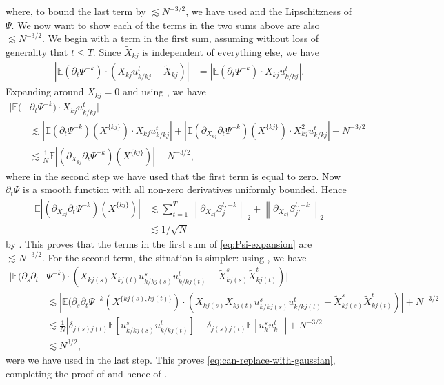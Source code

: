 \documentclass{article}
\newcommand{\1}{\mathbbm{1}}
\newcommand{\norm}[1]{\left\lVert#1\right\rVert}
\theoremstyle{plain}
\theoremstyle{definition}
\theoremstyle{remark}
\newcommand{\E}{\mathbb{E}}
\begin{document}
    where, to bound the last term by $\lesssim N^{-3/2}$, we have used  and the Lipschitzness of $\Psi.$ We now want to show each of the terms in the two sums above are also $\lesssim N^{-3/2}.$ We begin with a term in the first sum, assuming without loss of generality that $t\leq T.$ Since $\tilde{X}_{kj}$ is independent of everything else, we have 
    \begin{align*}
        |\E (\partial_t \Psi^{-k})\cdot (X_{kj}u_{k/kj}^{t} - \tilde{X}_{kj})| &=|\E (\partial_t \Psi^{-k})\cdot X_{kj} u_{k/kj}^{t}|.
    \end{align*}
    Expanding around $X_{kj}=0$ and using , we have 
    \begin{align*}
        |\E (&\partial_t \Psi^{-k})\cdot X_{kj} u_{k/kj}^{t}| \\
        &\lesssim  |\E (\partial_t \Psi^{-k})(X^{\{kj\}})\cdot X_{kj} u_{k/kj}^{t}| + |\E ( \partial_{X_{kj}}\partial_t\Psi^{-k})(X^{\{kj\}})\cdot X^2_{kj} u_{k/kj}^{t}| + N^{-3/2}\\
        &\lesssim \frac{1}{N}\E| ( \partial_{X_{kj}}\partial_t\Psi^{-k})(X^{\{kj\}})| + N^{-3/2},
    \end{align*}
    where in the second step we have used that the first term is equal to zero. Now $\partial_t \Psi$ is a smooth function with all non-zero derivatives uniformly bounded. Hence
    \begin{align*}
        \E| ( \partial_{X_{kj}}\partial_t\Psi^{-k})(X^{\{kj\}})| &\lesssim \sum_{t=1}^T \norm{\partial_{X_{kj}}S^{t,-k}_j}_2 + \norm{\partial_{X_{kj}}S^{t,-k}_{j'}}_2 \\
        &\lesssim 1/\sqrt{N}
    \end{align*}
    by . This proves that the terms in the first sum of \eqref{eq:Psi-expansion} are $\lesssim N^{-3/2}.$ For the second term, the situation is simpler: using , we have
    \begin{align*}
        | \E(\partial_{s}\partial_t &\Psi^{-k})\cdot (X_{kj(s)}X_{kj(t)}u_{k/kj(s)}^{s}u_{k/kj(t)}^{t} - \tilde{X}^s_{kj(s)}\tilde{X}^t_{kj(t)})| \\
        &\lesssim | \E(\partial_{s}\partial_t \Psi^{-k}(X^{\{kj(s), kj(t)\}})\cdot (X_{kj(s)}X_{kj(t)}u_{k/kj(s)}^{s}u_{k/kj(t)}^{t} - \tilde{X}^s_{kj(s)}\tilde{X}^t_{kj(t)})| + N^{-3/2}\\
        &\lesssim \frac{1}{N}|\delta_{j(s)j(t)}\E[u_{k/kj(s)}^{s}u_{k/kj(t)}^{t}] - \delta_{j(s)j(t)} \E [u_k^{s}u_k^{t}]|  + N^{-3/2} \\
        &\lesssim N^{3/2},
    \end{align*}
    were we have used  in the last step. This proves \eqref{eq:can-replace-with-gaussian}, completing the proof of  and hence of .
\end{document}
